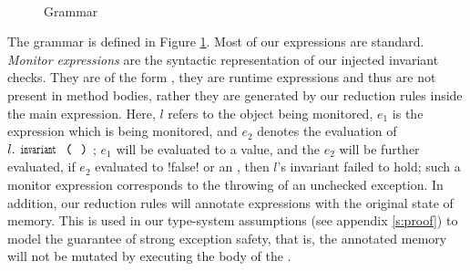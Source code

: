 \begin{figure}
\begin{grammatica}
		
		\\
		\\
		\\
		\\
		\\
		\\
	\end{grammatica}%
\SS[1]\caption{Grammar}\label{f:grammar}\SS[1.5]
\end{figure}


The grammar is defined in Figure \ref{f:grammar}. 
Most of our expressions are standard.
\emph{Monitor expressions}
are the syntactic representation of our injected invariant checks.
They are of the form , they 
are runtime expressions and thus are not present in method bodies, rather they are generated by our reduction rules inside the main expression. Here, $l$ refers to the object being monitored, $e_1$ is the expression which is being monitored, and $e_2$ denotes the evaluation of $l.\invariant$; $e_1$ will be evaluated to a value, and the $e_2$ will be further evaluated, if $e_2$ evaluated to \Q!false! or an \error, then $l$'s invariant failed to hold; such a monitor expression corresponds to the throwing of an unchecked exception.
In addition, our reduction rules will annotate \Q@try@ expressions with
the original state of memory. This is used in our type-system assumptions (see appendix \ref{s:proof}) to model the guarantee of strong exception safety, that is, the annotated memory will not be mutated by executing the body of the \Q@try@.

